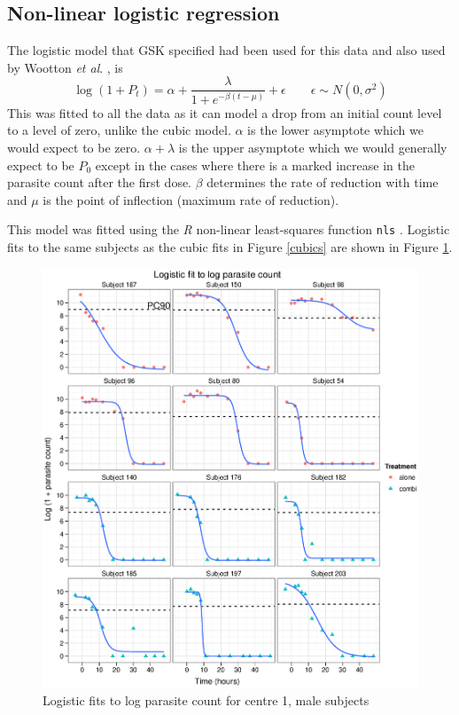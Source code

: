 \subsection{Non-linear logistic regression}
The logistic model that GSK specified had been used for this data and also used by Wootton \textit{et al}. \cite{wootton}, is
$$\log(1+P_t)=\alpha+\frac{\lambda}{1+e^{-\beta(t-\mu)}}+\epsilon\quad\quad\epsilon\sim N(0,\sigma^2)$$
This was fitted to all the data as it can model a drop from an initial count level to a level of zero, unlike the cubic model. $\alpha$ is the lower asymptote which we would expect to be zero. $\alpha+\lambda$ is the upper asymptote which we would generally expect to be $P_0$ except in the cases where there is a marked increase in the parasite count after the first dose. $\beta$ determines the rate of reduction with time and $\mu$ is the point of inflection (maximum rate of reduction).

This model was fitted using the \emph{R} non-linear least-squares function \texttt{nls} \cite{R}. Logistic fits to the same subjects as the cubic fits in Figure \ref{cubics} are shown in Figure \ref{logistics}.
\begin{figure}[h]
\includegraphics[width=150mm]{logistics.eps} 
\caption{Logistic fits to log parasite count for centre 1, male subjects}\label{logistics}
\end{figure}

